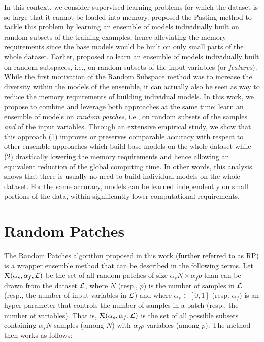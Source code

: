 In this context, we consider supervised learning problems for which the dataset
is so large that it cannot be loaded into memory. \citet{breiman:1999} proposed
the Pasting method to tackle this problem by learning an ensemble of models
individually built on random subsets of the training examples, hence
alleviating the memory requirements since the base models would be built on
only small parts of the whole dataset. Earlier, \citet{ho:1998} proposed to
learn an ensemble of models individually built on random subspaces, i.e., on
random subsets of the input variables (or \textit{features}). While the first motivation of the Random
Subspace method was to increase the diversity within the models of the
ensemble, it can actually also be seen as way to reduce the memory requirements
of building individual models. In this work, we propose to combine and leverage
both approaches at the same time: learn an ensemble of models on \textit{random
patches}, i.e., on random subsets of the samples \textit{and} of the input
variables. Through an extensive empirical study, we show that this approach (1)
improves or preserves comparable accuracy with respect to other ensemble
approaches which build base models on the whole dataset while (2) drastically
lowering the memory requirements and hence allowing an equivalent reduction of
the global computing time. In other words, this analysis shows that there is
usually no need to build individual models on the whole dataset. For the same
accuracy, models can be learned independently on small portions of the data,
within significantly lower computational requirements.

\section{Random Patches}
\label{sec:9:rp}

The Random Patches algorithm proposed in this work (further referred to as RP)
is a wrapper ensemble method that can be described in the following terms. Let
${\cal R}(\alpha_s, \alpha_f, {\cal L})$ be the set of all random patches of
size $\alpha_s N \times \alpha_f p$ than can be drawn from the dataset ${\cal
L}$, where $N$ (resp., $p$) is the number of samples in ${\cal L}$ (resp.,  the
number of input variables in ${\cal L}$) and where $\alpha_s \in [0, 1]$ (resp.
$\alpha_f$) is an hyper-parameter that controls the number of samples in a
patch (resp., the number of variables). That is, ${\cal R}(\alpha_s, \alpha_f,
{\cal L})$ is the set of all possible subsets containing $\alpha_s N$ samples
(among $N$) with $\alpha_f p$ variables (among $p$). The method then works as
follows:

